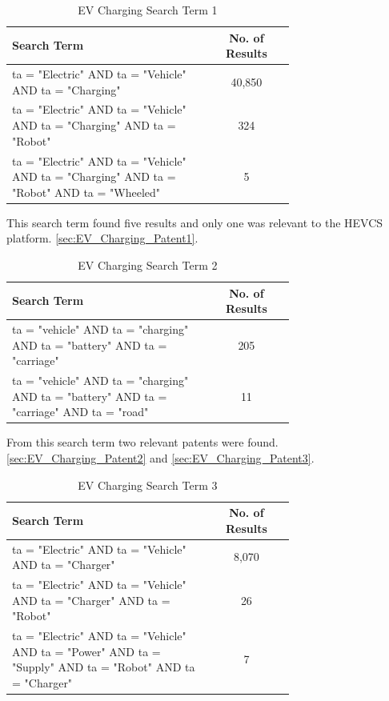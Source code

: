 \documentclass [12pt]{article}
\begin{document}
\begin{table}[H]
    \centering
    \setlength{\arrayrulewidth}{1.5pt}
    \begin{tabular}{|p{0.7\linewidth}|c|}
    \hline
    \cellcolor{gray!40}Search Term & \cellcolor{gray!40}No. of Results \\
    \hline
    ta = "Electric" AND ta = "Vehicle" AND ta = "Charging" & 40,850 \\
    \hline
    ta = "Electric" AND ta = "Vehicle" AND ta = "Charging" AND ta = "Robot" & 324 \\
    \hline
    ta = "Electric" AND ta = "Vehicle" AND ta = "Charging" AND ta = "Robot" AND ta = "Wheeled" & 5 \\
    \hline
    \end{tabular}
    \caption{EV Charging Search Term 1}
    \label{table:EV_Charging_Search_Term1}
\end{table}

This search term found five results and only one was relevant to the HEVCS platform. \ref{sec:EV_Charging_Patent1}.

\begin{table}[H]
    \centering
    \setlength{\arrayrulewidth}{1.5pt}
    \begin{tabular}{|p{0.7\linewidth}|c|}
    \hline
    \cellcolor{gray!40}Search Term & \cellcolor{gray!40}No. of Results \\
    \hline
    ta = "vehicle" AND ta = "charging" AND ta = "battery" AND ta = "carriage" & 205 \\
    \hline
    ta = "vehicle" AND ta = "charging" AND ta = "battery" AND ta = "carriage" AND ta = "road" & 11 \\
    \hline
    \end{tabular}
    \caption{EV Charging Search Term 2}
    \label{table:EV_Charging_Search_Term2}
\end{table}

From this search term two relevant patents were found. \ref{sec:EV_Charging_Patent2} and \ref{sec:EV_Charging_Patent3}.

\begin{table}[H]
    \centering
    \setlength{\arrayrulewidth}{1.5pt}
    \begin{tabular}{|p{0.7\linewidth}|c|}
    \hline
    \cellcolor{gray!40}Search Term & \cellcolor{gray!40}No. of Results \\
    \hline
    ta = "Electric" AND ta = "Vehicle" AND ta = "Charger" & 8,070 \\
    \hline
    ta = "Electric" AND ta = "Vehicle" AND ta = "Charger" AND ta = "Robot" & 26 \\
    \hline
    ta = "Electric" AND ta = "Vehicle" AND ta = "Power" AND ta = "Supply" AND ta = "Robot" AND ta = "Charger" & 7 \\
    \hline
    \end{tabular}
    \caption{EV Charging Search Term 3}
    \label{table:EV_Charging_Search_Term3}
\end{table}
\end{document}
